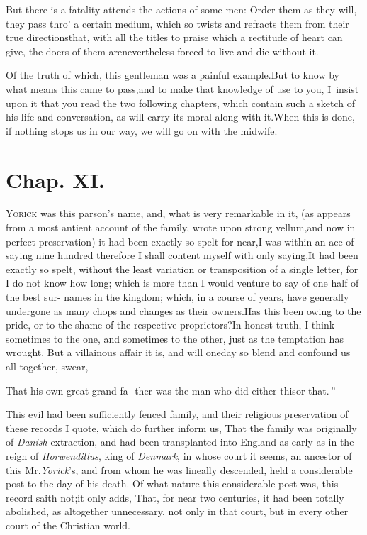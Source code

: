 \documentclass{article}
\begin{document}
But there is a fatality attends the actions of some men: Order
them as they will, they pass thro’ a certain medium, which so twists and refracts them from their true
directions\tsh  that, with all the titles to praise which a
rectitude of heart can give, the doers of them are\pb nevertheless
forced to live and die without it.

Of the truth of which, this gentleman was a painful
example.\tsh  But to know by what means this came to
pass,\tsk  and to make that knowledge of use to you, I~insist upon
it that you read the two following chapters, which contain such a
sketch of his life and conversation, as will carry its moral along
with it.\tsk  When this is done, if nothing stops us in our way,
we will go on with the midwife.

\section{Chap. XI.}

\lettrine{Y}{orick} was this parson’s name, and, what is very remarkable in it, (as
appears from a most antient account of the family, wrote upon strong vellum,\pb and
now in perfect preservation) it had been exactly so spelt for near,\tsk  I was
within an ace of saying nine hundred\break
{}
therefore I
shall content myself with only saying,\tsh  It had been exactly so spelt, without the
least variation or transposition of a single letter, for I do not know how long;
which is more than I would venture to say of one half of the best sur-\break 
names in the
kingdom; which, in a course of years, have generally undergone as many chops and
changes as their owners.\tsk  Has this been owing to the pride, or to the shame of
the respective proprietors?\tsk  In honest truth, I think sometimes to the one, and
sometimes to the other, just as the temptation has wrought. But a villainous affair
it is, and will one\pb day so blend and confound us all together,
swear, \begin{story}{That his own great grand fa-} 
ther was the man who did either this\break or that.\,” 
\end{story}

\vspace\parskip
This evil had been sufficiently fenced 
family, and their religious
preservation of these records I quote, which do further inform us,
That the family was originally of \textit{Danish} extraction, and had
been transplanted into England as early as in the reign of
\textit{Horwendillus}, king of \textit{Denmark}, in whose court it
seems, an ancestor of this Mr.\@ \textit{Yorick}’s, and from whom
he was lineally descended, held a considerable post to the day of
his death. Of what nature this considerable post was, this record
saith not;\tsk  it only adds, That, for near two centuries, it had
been totally abolished, as altogether unnecessary, not only in that
court, but in every other court of the Christian world.
\end{document}
